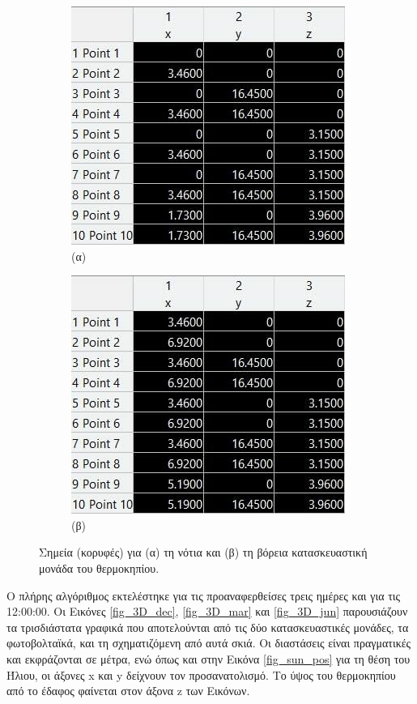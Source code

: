 \documentclass[12pt, a4paper]{report} %
\newcommand{\english}{\foreignlanguage{english}}
\begin{document}
\begin{figure}[ht]
    \centering
    \begin{subfigure}{0.5\textwidth}
        \centering
        \includegraphics[scale=4.8]{Figures/matlab_grh_points_north.jpg}
        \caption*{(α)}{}
    \end{subfigure}%
    \begin{subfigure}{0.5\textwidth}
        \centering
        \includegraphics[scale=4.8]{Figures/matlab_grh_points_south.jpg}
        \caption*{(β)}{}
    \end{subfigure}%
    \caption{Σημεία (κορυφές) για (α) τη νότια και (β) τη βόρεια κατασκευαστική μονάδα του θερμοκηπίου.}
    \label{fig_matlab_points}
\end{figure}

Ο πλήρης αλγόριθμος εκτελέστηκε για τις προαναφερθείσες τρεις ημέρες και για τις 12:00:00. Οι Εικόνες 
\ref{fig_3D_dec}, \ref{fig_3D_mar} και \ref{fig_3D_jun} παρουσιάζουν τα τρισδιάστατα γραφικά που αποτελούνται 
από τις δύο κατασκευαστικές μονάδες, τα φωτοβολταϊκά, και τη σχηματιζόμενη από αυτά σκιά. Οι διαστάσεις είναι 
πραγματικές και εκφράζονται σε μέτρα, ενώ όπως και στην Εικόνα \ref{fig_sun_pos} για τη θέση του Ήλιου, οι άξονες 
\english{x} και \english{y} δείχνουν τον προσανατολισμό. Το ύψος του θερμοκηπίου από το έδαφος φαίνεται στον 
άξονα \english{z} των Εικόνων.
\end{document}
